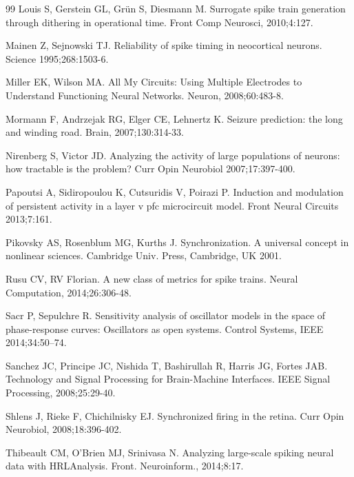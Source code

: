 \documentclass[10pt,twocolumn]{elsart5p}
\begin{document}
\begin{thebibliography}{25}
\begin{thebibliography} {99}
Louis S, Gerstein GL, Gr{\"u}n S, Diesmann M. Surrogate spike train generation through dithering in operational time. Front Comp Neurosci, 2010;4:127.

Mainen Z, Sejnowski TJ. Reliability of spike timing in neocortical neurons. Science 1995;268:1503-6.

Miller EK, Wilson MA. All My Circuits: Using Multiple Electrodes to Understand Functioning Neural Networks. Neuron, 2008;60:483-8.

Mormann F, Andrzejak RG, Elger CE, Lehnertz K. Seizure prediction: the long and winding road. Brain, 2007;130:314-33.

Nirenberg S, Victor JD. Analyzing the activity of large populations of neurons: how tractable is the problem? Curr Opin Neurobiol 2007;17:397-400.

Papoutsi A, Sidiropoulou K, Cutsuridis V, Poirazi P. Induction and modulation of persistent activity in a layer v pfc microcircuit model. Front Neural Circuits 2013;7:161.

Pikovsky AS, Rosenblum MG, Kurths J. Synchronization. A universal concept in nonlinear sciences. Cambridge Univ. Press, Cambridge, UK 2001.

Rusu CV, RV Florian. A new class of metrics for spike trains. Neural Computation, 2014;26:306-48.

Sacr P, Sepulchre R. Sensitivity analysis of oscillator models in the space of phase-response curves: Oscillators as open systems. Control Systems, IEEE 2014;34:50–74.

Sanchez JC, Principe JC, Nishida T, Bashirullah R, Harris JG, Fortes JAB. Technology and Signal Processing for Brain-Machine Interfaces. IEEE Signal Processing, 2008;25:29-40.

Shlens J, Rieke F, Chichilnisky EJ. Synchronized firing in the retina. Curr Opin Neurobiol, 2008;18:396-402.

Thibeault CM, {O'Brien} MJ, Srinivasa N. Analyzing large-scale spiking neural data with HRLAnalysis. Front. Neuroinform., 2014;8:17.


\end{thebibliography}
\end{thebibliography}
\end{document}
